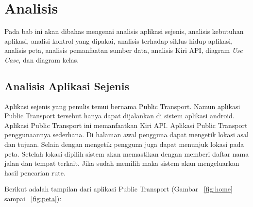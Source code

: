 \chapter{Analisis}
\label{chap:analisi}

Pada bab ini akan dibahas mengenai analisis aplikasi sejenis, analisis kebutuhan aplikasi, analisi kontrol yang dipakai, analisis terhadap siklus hidup aplikasi, analisis peta, analisis pemanfaatan sumber data, analisis Kiri API, diagram \textit{Use Case}, dan diagram kelas.

\section{Analisis Aplikasi Sejenis}
\label{lab:Analisis Aplikasi Sejenis}
\hspace{0.5cm} Aplikasi sejenis yang penulis temui bernama Public Transport\footnotemark[1]. Namun aplikasi Public Transport tersebut hanya dapat dijalankan di sistem aplikasi android. Aplikasi Public Transport ini memanfaatkan Kiri API. Aplikasi Public Transport penggunaannya sederhana. Di halaman awal pengguna dapat mengetik lokasi asal dan tujuan. Selain dengan mengetik pengguna juga dapat menunjuk lokasi pada peta. Setelah lokasi dipilih sistem akan memastikan dengan memberi daftar nama jalan dan tempat terkait. Jika sudah memilih maka sistem akan mengeluarkan hasil pencarian rute.

Berikut adalah tampilan dari aplikasi Public Transport (Gambar ~\ref{fig:home} sampai ~\ref{fig:peta}):

